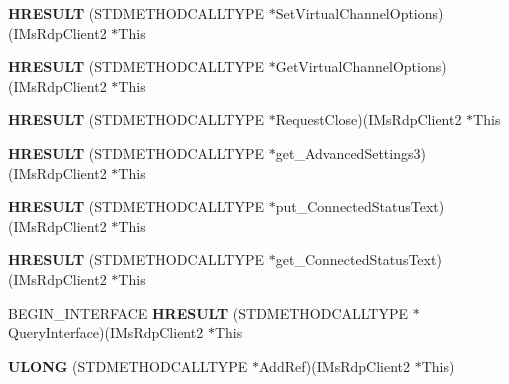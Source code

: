 \begin{DoxyCompactItemize}
{\bfseries H\+R\+E\+S\+U\+LT} (S\+T\+D\+M\+E\+T\+H\+O\+D\+C\+A\+L\+L\+T\+Y\+PE $\ast$Set\+Virtual\+Channel\+Options)(I\+Ms\+Rdp\+Client2 $\ast$This
\item 
\mbox{\label{struct_i_ms_rdp_client2_vtbl_ad28e230998f3c3ebc86d0c0246ab9383}} 
{\bfseries H\+R\+E\+S\+U\+LT} (S\+T\+D\+M\+E\+T\+H\+O\+D\+C\+A\+L\+L\+T\+Y\+PE $\ast$Get\+Virtual\+Channel\+Options)(I\+Ms\+Rdp\+Client2 $\ast$This
\item 
\mbox{\label{struct_i_ms_rdp_client2_vtbl_ab6b6c9e6fdbfd572b20f13836c0b256a}} 
{\bfseries H\+R\+E\+S\+U\+LT} (S\+T\+D\+M\+E\+T\+H\+O\+D\+C\+A\+L\+L\+T\+Y\+PE $\ast$Request\+Close)(I\+Ms\+Rdp\+Client2 $\ast$This
\item 
\mbox{\label{struct_i_ms_rdp_client2_vtbl_a99d2046db065076208b614f14e604c7e}} 
{\bfseries H\+R\+E\+S\+U\+LT} (S\+T\+D\+M\+E\+T\+H\+O\+D\+C\+A\+L\+L\+T\+Y\+PE $\ast$get\+\_\+\+Advanced\+Settings3)(I\+Ms\+Rdp\+Client2 $\ast$This
\item 
\mbox{\label{struct_i_ms_rdp_client2_vtbl_af0cf526ec00bad7dfc45b83781e83d67}} 
{\bfseries H\+R\+E\+S\+U\+LT} (S\+T\+D\+M\+E\+T\+H\+O\+D\+C\+A\+L\+L\+T\+Y\+PE $\ast$put\+\_\+\+Connected\+Status\+Text)(I\+Ms\+Rdp\+Client2 $\ast$This
\item 
\mbox{\label{struct_i_ms_rdp_client2_vtbl_a75dbbb19ec1f065e356764d5899e878a}} 
{\bfseries H\+R\+E\+S\+U\+LT} (S\+T\+D\+M\+E\+T\+H\+O\+D\+C\+A\+L\+L\+T\+Y\+PE $\ast$get\+\_\+\+Connected\+Status\+Text)(I\+Ms\+Rdp\+Client2 $\ast$This
\item 
\mbox{\label{struct_i_ms_rdp_client2_vtbl_a471d0443d470e7fd4f5efd84347e1635}} 
B\+E\+G\+I\+N\+\_\+\+I\+N\+T\+E\+R\+F\+A\+CE {\bfseries H\+R\+E\+S\+U\+LT} (S\+T\+D\+M\+E\+T\+H\+O\+D\+C\+A\+L\+L\+T\+Y\+PE $\ast$Query\+Interface)(I\+Ms\+Rdp\+Client2 $\ast$This
\item 
\mbox{\label{struct_i_ms_rdp_client2_vtbl_a85b78baa4ebc0ab13ebdf03abe9889e2}} 
{\bfseries U\+L\+O\+NG} (S\+T\+D\+M\+E\+T\+H\+O\+D\+C\+A\+L\+L\+T\+Y\+PE $\ast$Add\+Ref)(I\+Ms\+Rdp\+Client2 $\ast$This)
\item 

\end{DoxyCompactItemize}
